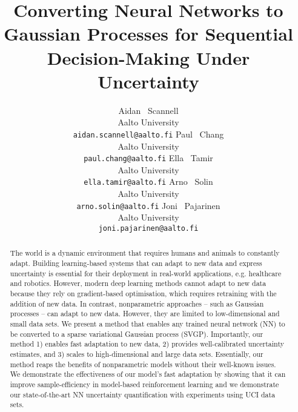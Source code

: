 \documentclass{article}
\title{Converting Neural Networks to Gaussian Processes for Sequential Decision-Making Under Uncertainty}
\author{%
  Aidan ~Scannell \\
  Aalto University\\
  \texttt{aidan.scannell@aalto.fi}
  \And
  Paul ~Chang \\
  Aalto University\\
  \texttt{paul.chang@aalto.fi}
  \And
  Ella ~Tamir \\
  Aalto University\\
  \texttt{ella.tamir@aalto.fi}
  \And
  Arno ~Solin \\
  Aalto University\\
  \texttt{arno.solin@aalto.fi}
  \And
  Joni ~Pajarinen \\
  Aalto University\\
  \texttt{joni.pajarinen@aalto.fi}
}
\begin{document}
\maketitle

\begin{abstract}
%
The world is a dynamic environment that requires humans and animals to constantly adapt.
  Building learning-based systems that can adapt to new data and express uncertainty is essential for their deployment in real-world applications, e.g. healthcare and robotics. However, modern deep learning methods cannot adapt to new data because they rely on gradient-based optimisation, which requires retraining with the addition of new data. In contrast, nonparametric approaches -- such as Gaussian processes -- can adapt to new data. However, they are limited to low-dimensional and small data sets. We present a method that enables any trained neural network (NN) to be converted to a sparse variational Gaussian process (SVGP). Importantly, our method 1) enables fast adaptation to new data, 2) provides well-calibrated uncertainty estimates, and 3) scales to high-dimensional and large data sets. Essentially, our method reaps the benefits of nonparametric models without their well-known issues. We demonstrate the effectiveness of our model's fast adaptation by showing that it can improve sample-efficiency in model-based reinforcement learning and we demonstrate our state-of-the-art NN uncertainty quantification with experiments using UCI data sets.


\end{abstract}
\end{document}
